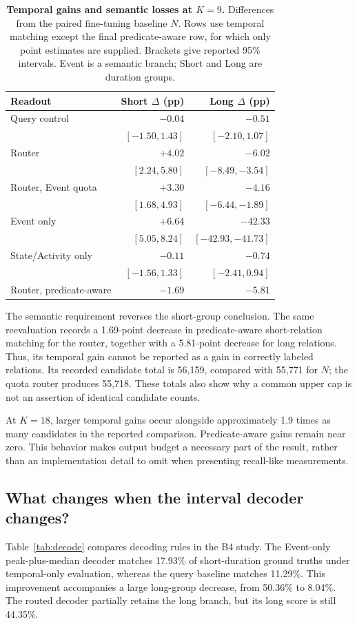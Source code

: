 \documentclass[10pt,twocolumn,letterpaper]{article}
\begin{document}
\begin{table}[t]
\centering\small
\setlength{\tabcolsep}{3pt}
\begin{tabular}{lrr}
\toprule
Readout & Short $\Delta$ (pp) & Long $\Delta$ (pp)\\
\midrule
Query control & $-0.04$ & $-0.51$\\
 & $[-1.50,1.43]$ & $[-2.10,1.07]$\\
Router & $+4.02$ & $-6.02$\\
 & $[2.24,5.80]$ & $[-8.49,-3.54]$\\
Router, Event quota & $+3.30$ & $-4.16$\\
 & $[1.68,4.93]$ & $[-6.44,-1.89]$\\
Event only & $+6.64$ & $-42.33$\\
 & $[5.05,8.24]$ & $[-42.93,-41.73]$\\
State/Activity only & $-0.11$ & $-0.74$\\
 & $[-1.56,1.33]$ & $[-2.41,0.94]$\\
\midrule
Router, predicate-aware & $-1.69$ & $-5.81$\\
\bottomrule
\end{tabular}
\caption{\textbf{Temporal gains and semantic losses at $K=9$.} Differences from the paired fine-tuning baseline $N$. Rows use temporal matching except the final predicate-aware row, for which only point estimates are supplied. Brackets give reported 95\% intervals. Event is a semantic branch; Short and Long are duration groups.}
\label{tab:clean}
\end{table}

The semantic requirement reverses the short-group conclusion. The same reevaluation records a 1.69-point decrease in predicate-aware short-relation matching for the router, together with a 5.81-point decrease for long relations. Thus, its temporal gain cannot be reported as a gain in correctly labeled relations. Its recorded candidate total is 56,159, compared with 55,771 for $N$; the quota router produces 55,718. These totals also show why a common upper cap is not an assertion of identical candidate counts.

At $K=18$, larger temporal gains occur alongside approximately 1.9 times as many candidates in the reported comparison. Predicate-aware gains remain near zero. This behavior makes output budget a necessary part of the result, rather than an implementation detail to omit when presenting recall-like measurements.

\subsection{What changes when the interval decoder changes?}
Table~\ref{tab:decode} compares decoding rules in the B4 study. The Event-only peak-plus-median decoder matches 17.93\% of short-duration ground truths under temporal-only evaluation, whereas the query baseline matches 11.29\%. This improvement accompanies a large long-group decrease, from 50.36\% to 8.04\%. The routed decoder partially retains the long branch, but its long score is still 44.35\%.
\end{document}
